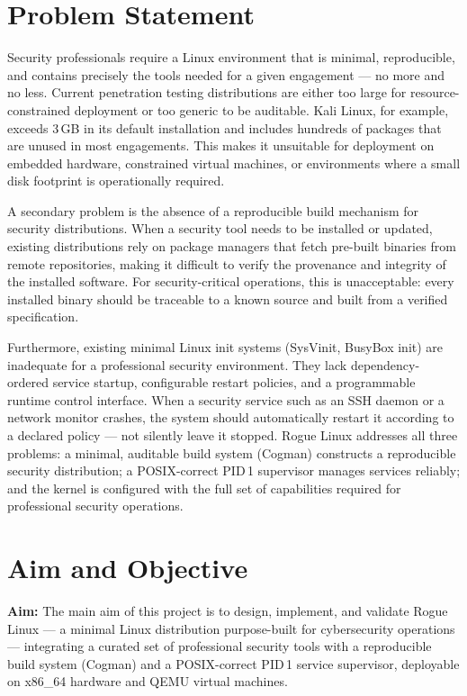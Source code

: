 \documentclass[12pt,a4paper]{report}
\begin{document}
\section{Problem Statement}

Security professionals require a Linux environment that is minimal, reproducible,
and contains precisely the tools needed for a given engagement --- no more and no
less. Current penetration testing distributions are either too large for
resource-constrained deployment or too generic to be auditable. Kali Linux, for
example, exceeds 3\,GB in its default installation and includes hundreds of
packages that are unused in most engagements. This makes it unsuitable for
deployment on embedded hardware, constrained virtual machines, or environments
where a small disk footprint is operationally required.

A secondary problem is the absence of a reproducible build mechanism for
security distributions. When a security tool needs to be installed or updated,
existing distributions rely on package managers that fetch pre-built binaries
from remote repositories, making it difficult to verify the provenance and
integrity of the installed software. For security-critical operations, this is
unacceptable: every installed binary should be traceable to a known source and
built from a verified specification.

Furthermore, existing minimal Linux init systems (SysVinit, BusyBox init) are
inadequate for a professional security environment. They lack dependency-ordered
service startup, configurable restart policies, and a programmable runtime control
interface. When a security service such as an SSH daemon or a network monitor
crashes, the system should automatically restart it according to a declared policy
--- not silently leave it stopped. Rogue Linux addresses all three problems: a
minimal, auditable build system (Cogman) constructs a reproducible security
distribution; a POSIX-correct PID\,1 supervisor manages services reliably; and
the kernel is configured with the full set of capabilities required for
professional security operations.

\section{Aim and Objective}

\textbf{Aim:} The main aim of this project is to design, implement, and validate
Rogue Linux --- a minimal Linux distribution purpose-built for cybersecurity
operations --- integrating a curated set of professional security tools with a
reproducible build system (Cogman) and a POSIX-correct PID\,1 service supervisor,
deployable on x86\_64 hardware and QEMU virtual machines.
\end{document}
